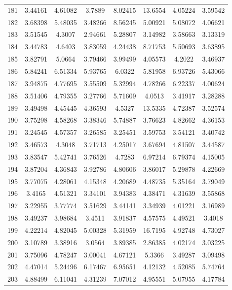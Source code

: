 \begin{figure}
\begin{tabular}{cccccccc}
181 & 3.44161 & 4.61082 & 3.7889 & 8.02415 & 13.6554 & 4.05224 & 3.59542\\
182 & 3.68398 & 5.48035 & 3.48266 & 8.56245 & 5.00921 & 5.08072 & 4.06621\\
183 & 3.51545 & 4.3007 & 2.94661 & 5.28807 & 3.14982 & 3.58663 & 3.13319\\
184 & 3.44783 & 4.6403 & 3.83059 & 4.24438 & 8.71753 & 5.50693 & 3.63895\\
185 & 3.82791 & 5.0664 & 3.79466 & 3.99499 & 4.05573 & 4.2022 & 3.46937\\
186 & 5.84241 & 6.51334 & 5.93765 & 6.0322 & 5.81958 & 6.93726 & 5.43066\\
187 & 3.94875 & 4.77695 & 3.55509 & 5.32994 & 4.78266 & 6.22337 & 4.00624\\
188 & 3.51406 & 4.79355 & 3.27766 & 5.71609 & 4.0513 & 3.41917 & 3.28288\\
189 & 3.49498 & 4.45445 & 4.36593 & 4.5327 & 13.5335 & 4.72387 & 3.52574\\
190 & 3.75298 & 4.58268 & 3.38346 & 5.74887 & 3.76623 & 4.82662 & 4.36153\\
191 & 3.24545 & 4.57357 & 3.26585 & 3.25451 & 3.59753 & 3.54121 & 3.40742\\
192 & 3.46573 & 4.3048 & 3.71713 & 4.25017 & 3.67694 & 4.81507 & 3.44587\\
193 & 3.83547 & 5.42741 & 3.76526 & 4.7283 & 6.97214 & 6.79374 & 4.15005\\
194 & 3.87204 & 4.36843 & 3.92786 & 4.80606 & 3.86017 & 5.29878 & 4.22669\\
195 & 3.77075 & 4.28061 & 4.15348 & 4.20689 & 4.48735 & 5.35164 & 3.79049\\
196 & 3.4165 & 4.51321 & 3.34101 & 3.94383 & 4.38471 & 4.31639 & 3.55868\\
197 & 3.22955 & 3.77774 & 3.51629 & 3.44141 & 3.34939 & 4.01221 & 3.16989\\
198 & 3.49237 & 3.98684 & 3.4511 & 3.91837 & 4.57575 & 4.49521 & 3.4018\\
199 & 4.22214 & 4.82045 & 5.00328 & 5.31959 & 16.7195 & 4.92748 & 4.73027\\
200 & 3.10789 & 3.38916 & 3.0564 & 3.89385 & 2.86385 & 4.02174 & 3.03225\\
201 & 3.75096 & 4.78247 & 3.00041 & 4.67121 & 5.3366 & 3.49287 & 3.09498\\
202 & 4.47014 & 5.24496 & 6.17467 & 6.95651 & 4.12132 & 4.52085 & 5.74764\\
203 & 4.88499 & 6.11041 & 4.31239 & 7.07012 & 4.95551 & 5.07955 & 4.17784\\

\end{tabular}
\end{figure}
